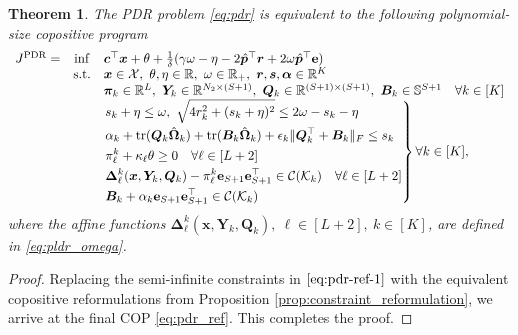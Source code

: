 \documentclass{article}
\newcommand{\st}{\textnormal{s.t.}}
\newcommand{\RR}{\mathbb{R}}
\newcommand{\X}{\mathcal{X}}
\newcommand{\tr}{\textup{tr}}
\newtheorem{theorem}{Theorem}
\begin{document}
\begin{theorem}
The PDR problem \eqref{eq:pdr} is equivalent to the following polynomial-size copositive program 
\begin{equation}
\label{eq:pdr_ref}
\begin{array}{ccll}
J^{\textup{PDR}} = &  \displaystyle \inf & \bm c^\top \bm x + \theta + \frac{1}{\delta} ( \gamma \omega - \eta - 2\hat{\bm p}^\top \bm r + 2\omega\hat{\bm p}^\top \mathbf{e}) \\
& \st & \bm x \in \X, \  \theta, \eta \in \RR,\ \omega \in \RR_{+},\ \bm r, \bm s, \bm \alpha \in \RR^{K} \\
& & \bm \pi_k \in \RR^L, \ \bm Y_k \in \RR^{N_2 \times (S+1)},\ \bm Q_k \in \RR^{(S+1) \times (S+1)}, \ \bm B_k \in \mathbb{S}^{S+1} \quad \forall k \in [K] \\
& & \left.
\begin{aligned}
& s_k + \eta \leq \omega, \ \sqrt{4r_k^2 + (s_k +  \eta)^2} \leq 2\omega - s_k -\eta \\
& \alpha_k + \tr(\bm Q_k\hat{\bm\Omega}_k) + \tr(\bm B_k\hat{\bm\Omega}_k) + \epsilon_k\|\bm Q_k^\top +  \bm B_k\|_F \leq s_k \\
& \pi^k_\ell + \kappa_\ell \theta \geq 0 \quad \forall \ell \in [L+2] \\
& \bm \Delta^k_\ell(\bm x,\bm Y_k,\bm Q_k) - \pi^k_\ell \mathbf{e}_{S+1} \mathbf{e}_{S+1}^\top 
\in \mathcal{C} (\mathcal K_k) \quad \forall \ell \in [L+2]  \\
& \bm B_k + \alpha_k \mathbf{e}_{S+1} \mathbf{e}_{S+1}^\top \in \mathcal{C} (\mathcal K_k)
\end{aligned} \right \} \forall k \in [K],
\end{array}
\end{equation}
where the affine functions $\bm \Delta^k_\ell(\bm x,\bm Y_k,\bm Q_k), \                                     \ell \in [L+2], \ k \in [K]$, are defined in \eqref{eq:pldr_omega}.
\end{theorem}

\begin{proof}
Replacing the semi-infinite constraints in $\eqref{eq:pdr-ref-1}$ with the equivalent copositive reformulations from Proposition \ref{prop:constraint_reformulation}, we arrive at the final COP \eqref{eq:pdr_ref}. This completes the proof. 
\end{proof}
\end{document}
